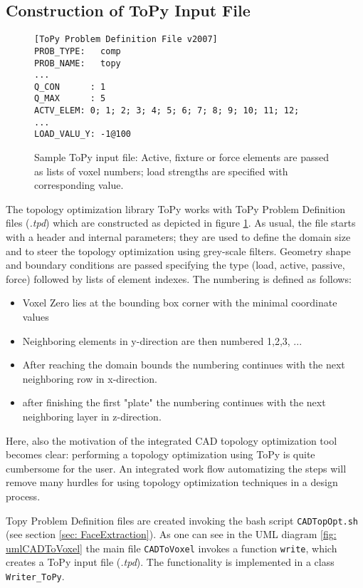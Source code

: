 \subsection{Construction of ToPy Input File}
\label{sec: ToPyInputConstruction}

\begin{figure}
\begin{lstlisting}
[ToPy Problem Definition File v2007]
PROB_TYPE:   comp
PROB_NAME:   topy
...
Q_CON      : 1
Q_MAX      : 5
ACTV_ELEM: 0; 1; 2; 3; 4; 5; 6; 7; 8; 9; 10; 11; 12; 
...
LOAD_VALU_Y: -1@100
\end{lstlisting}
\caption{Sample ToPy input file: Active, fixture or force elements are passed as lists of voxel numbers; load strengths are specified with corresponding value.}
\label{fig:TPDfile}
\end{figure}
The topology optimization library ToPy works with ToPy Problem Definition files ({\it.tpd}) which are constructed as depicted in figure \ref{fig:TPDfile}. As usual, the file starts with a header and internal parameters; they are used to define the domain size and to steer the topology optimization using grey-scale filters. Geometry shape and boundary conditions are passed specifying the type (load, active, passive, force) followed by lists of element indexes. The numbering is defined as follows:
\begin{itemize}
\item Voxel Zero lies at the bounding box corner with the minimal coordinate values
\item Neighboring elements in y-direction are then numbered 1,2,3, ...
\item After reaching the domain bounds the numbering continues with the next neighboring row in x-direction.
\item after finishing the first "plate" the numbering continues with the next neighboring layer in z-direction.
\end{itemize}
Here, also the motivation of the integrated CAD topology optimization tool becomes clear: performing a topology optimization using ToPy is quite cumbersome for the user. An integrated work flow automatizing the steps will remove many hurdles for using topology optimization techniques in a design process.  

Topy Problem Definition files are created invoking the bash script \lstinline|CADTopOpt.sh| (see section \ref{sec: FaceExtraction}). As one can see in the UML diagram \ref{fig: umlCADToVoxel} the main file \lstinline|CADToVoxel| invokes a function \lstinline|write|, which creates a ToPy input file ({\it.tpd}). The functionality is implemented in a class \lstinline|Writer_ToPy|.

